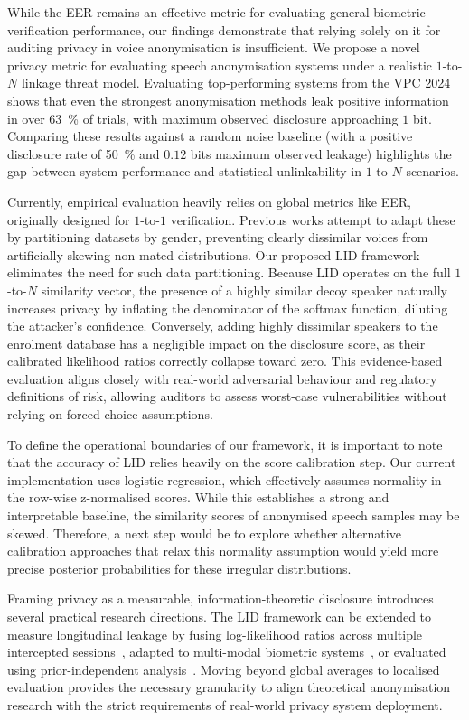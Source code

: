 While the EER remains an effective metric for evaluating general biometric verification performance, our findings demonstrate that relying solely on it for auditing privacy in voice anonymisation is insufficient. We propose a novel privacy metric for evaluating speech anonymisation systems under a realistic $1$-to-$N$ linkage threat model. Evaluating top-performing systems from the VPC 2024 shows that even the strongest anonymisation methods leak positive information in over \qty{63}{\percent} of trials, with maximum observed disclosure approaching $1$ bit. Comparing these results against a random noise baseline (with a positive disclosure rate of \qty{50}{\percent} and $0.12$ bits maximum observed leakage) highlights the gap between system performance and statistical unlinkability in $1$-to-$N$ scenarios.


Currently, empirical evaluation heavily relies on global metrics like EER, originally designed for $1$-to-$1$ verification. Previous works attempt to adapt these by partitioning datasets by gender, preventing clearly dissimilar voices from artificially skewing non-mated distributions. Our proposed LID framework eliminates the need for such data partitioning. Because LID operates on the full $1$-to-$N$ similarity vector, the presence of a highly similar decoy speaker naturally increases privacy by inflating the denominator of the softmax function, diluting the attacker's confidence. Conversely, adding highly dissimilar speakers to the enrolment database has a negligible impact on the disclosure score, as their calibrated likelihood ratios correctly collapse toward zero. This evidence-based evaluation aligns closely with real-world adversarial behaviour and regulatory definitions of risk, allowing auditors to assess worst-case vulnerabilities without relying on forced-choice assumptions.

To define the operational boundaries of our framework, it is important to note that the accuracy of LID relies heavily on the score calibration step. Our current implementation uses logistic regression, which effectively assumes normality in the row-wise z-normalised scores. While this establishes a strong and interpretable baseline, the similarity scores of anonymised speech samples may be skewed. Therefore, a next step would be to explore whether alternative calibration approaches that relax this normality assumption would yield more precise posterior probabilities for these irregular distributions.

Framing privacy as a measurable, information-theoretic disclosure introduces several practical research directions. The LID framework can be extended to measure longitudinal leakage by fusing log-likelihood ratios across multiple intercepted sessions~\cite{vauquier2025legally}, adapted to multi-modal biometric systems~\cite{backstrom2026privacy}, or evaluated using prior-independent analysis~\cite{nautsch2020privacy}. Moving beyond global averages to localised evaluation provides the necessary granularity to align theoretical anonymisation research with the strict requirements of real-world privacy system deployment.
